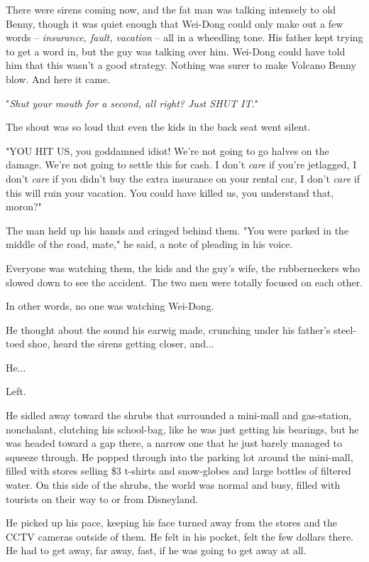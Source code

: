 There were sirens coming now, and the fat man was talking intensely
to old Benny, though it was quiet enough that Wei-Dong could only
make out a few words -- \emph{insurance, fault, vacation} -- all in
a wheedling tone. His father kept trying to get a word in, but the
guy was talking over him. Wei-Dong could have told him that this
wasn't a good strategy. Nothing was surer to make Volcano Benny
blow. And here it came.

"\emph{Shut your mouth for a second, all right? Just SHUT IT.}"

The shout was so loud that even the kids in the back seat went
silent.

"YOU HIT US, you goddamned idiot! We're not going to go halves on
the damage. We're not going to settle this for cash. I don't
\emph{care} if you're jetlagged, I don't \emph{care} if you didn't
buy the extra insurance on your rental car, I don't \emph{care} if
this will ruin your vacation. You could have killed us, you
understand that, moron?"

The man held up his hands and cringed behind them. "You were parked
in the middle of the road, mate," he said, a note of pleading in
his voice.

Everyone was watching them, the kids and the guy's wife, the
rubberneckers who slowed down to see the accident. The two men were
totally focused on each other.

In other words, no one was watching Wei-Dong.

He thought about the sound his earwig made, crunching under his
father's steel-toed shoe, heard the sirens getting closer, and...

He...

Left.

He sidled away toward the shrubs that surrounded a mini-mall and
gas-station, nonchalant, clutching his school-bag, like he was just
getting his bearings, but he was headed toward a gap there, a
narrow one that he just barely managed to squeeze through. He
popped through into the parking lot around the mini-mall, filled
with stores selling \$3 t-shirts and snow-globes and large bottles
of filtered water. On this side of the shrubs, the world was normal
and busy, filled with tourists on their way to or from Disneyland.

He picked up his pace, keeping his face turned away from the stores
and the CCTV cameras outside of them. He felt in his pocket, felt
the few dollars there. He had to get away, far away, fast, if he
was going to get away at all.

